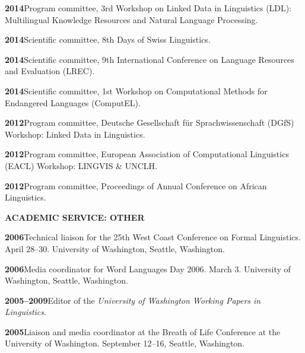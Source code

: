 \documentclass[11pt]{article}
\newcommand{\hangpara}{
 \setlength{\parindent}{0in} %
 \hangindent=0.42in %
}
\begin{document}
\vskip 6pt
\hangpara
{\bf 2014}\hspace{1ex}Program committee, 3rd Workshop on Linked Data in Linguistics (LDL): Multilingual Knowledge Resources and Natural Language Processing.

\vskip 6pt
\hangpara
{\bf 2014}\hspace{1ex}Scientific committee, 8th Days of Swiss Linguistics.

\vskip 6pt
\hangpara
{\bf 2014}\hspace{1ex}Scientific committee, 9th International Conference on Language Resources and Evaluation (LREC).

\vskip 6pt
\hangpara
{\bf 2014}\hspace{1ex}Scientific committee, 1st Workshop on Computational Methods for Endangered Languages (ComputEL).

\vskip 6pt
\hangpara
{\bf 2012}\hspace{1ex}Program committee, Deutsche Gesellschaft f{\"u}r Sprachwissenschaft (DGfS) Workshop: Linked Data in Linguistics.

\vskip 6pt
\hangpara
{\bf 2012}\hspace{1ex}Program committee, European Association of Computational Linguistics (EACL) Workshop: LINGVIS \& UNCLH.

\vskip 6pt
\hangpara
{\bf 2012}\hspace{1ex}Program committee, Proceedings of Annual Conference on African Linguistics.


\vskip 20pt
\begin{flushleft}
{\bf ACADEMIC SERVICE: OTHER}
\end{flushleft}

\hangpara
{\bf 2006}\hspace{1ex}Technical liaison for the 25th West Coast Conference on Formal Linguistics. April 28--30. University of Washington, Seattle, Washington.

\vskip 6pt
\hangpara
{\bf 2006}\hspace{1ex}Media coordinator for Word Languages Day 2006. March 3. University of Washington, Seattle, Washington.	

\vskip 6pt
\hangpara
{\bf 2005--2009}\hspace{1ex}Editor of the \textit{University of Washington Working Papers in Linguistics}.

\vskip 6pt
\hangpara
{\bf 2005}\hspace{1ex}Liaison and media coordinator at the Breath of Life Conference at the University of Washington. September 12--16, Seattle, Washington.
\end{document}
